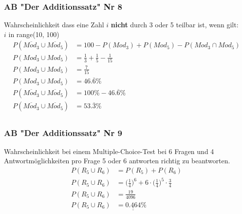 \documentclass[a4paper,12pt]{article}
\begin{document}
\subsubsection*{AB "Der Additionssatz" Nr 8}
Wahrscheinlichkeit dass eine Zahl $i$ \textbf{nicht} durch 3 oder 5 teilbar ist, wenn gilt:\\
$i$ in range(10, 100)\\
\begin{equation}
\begin{split}
P(\overline{Mod_3} \cup \overline{Mod_5}) & = 100 - P(Mod_3) + P(Mod_5) - P(Mod_3 \cap Mod_5)\\
P(Mod_3 \cup Mod_5) & = \frac{1}{3} + \frac{1}{5} - \frac{1}{15}\\
P(Mod_3 \cup Mod_5) & = \frac{7}{15}\\
P(Mod_3 \cup Mod_5) & = 46.\overline{6} \%\\
P(\overline{Mod_3} \cup \overline{Mod_5}) & = 100 \% - 46.\overline{6} \%\\
P(\overline{Mod_3} \cup \overline{Mod_5}) & = 53.\overline{3} \%\\
\end{split}
\end{equation}
\subsubsection*{AB "Der Additionssatz" Nr 9}
Wahrscheinlichkeit bei einem Multiple-Choice-Test bei 6 Fragen und 4 Antwortmöglichkeiten pro Frage 5 oder 6 antworten richtig zu beantworten.\\
\begin{equation}
\begin{split}
P(R_5 \cup R_6) & = P(R_5) + P(R_6)\\
P(R_5 \cup R_6) & = \Big(\frac{1}{4}\Big)^6 + 6 \cdot \Big(\frac{1}{4}\Big)^5 \cdot \frac{3}{4}\\
P(R_5 \cup R_6) & = \frac{19}{4096}\\
P(R_5 \cup R_6) & = \underline{\underline{0.464}} \%\\
\end{split}
\end{equation}
\pagebreak
\end{document}

